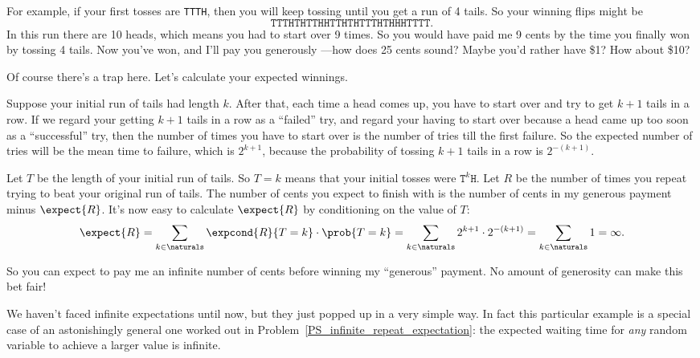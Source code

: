For example, if your first tosses are \texttt{TTTH}, then you will
keep tossing until you get a run of 4 tails.  So your winning
flips might be
\[
\texttt{TTTHTHTTHHTTHTHTTTHTHHHTTTT}.
\]
In this run there are 10 heads, which means you had to start over 9
times.  So you would have paid me 9 cents by the time you finally won
by tossing 4 tails.  Now you've won, and I'll pay you generously
---how does 25 cents sound?  Maybe you'd rather have \$1?  How about
\$10?

Of course there's a trap here.  Let's calculate your expected
winnings.

Suppose your initial run of tails had length $k$.  After that, each
time a head comes up, you have to start over and try to get $k+1$ tails
in a row.  If we regard your getting $k+1$ tails in a row as a
``failed'' try, and regard your having to start over because a head
came up too soon as a ``successful'' try, then the number of times you
have to start over is the number of tries till the first failure.  So
the expected number of tries will be the mean time to failure, which is
$2^{k+1}$, because the probability of tossing $k+1$ tails in a row is
$2^{-(k+1)}$.

Let $T$ be the length of your initial run of tails.  So $T = k$ means
that your initial tosses were $\texttt{T}^k\texttt{H}$.  Let $R$ be
the number of times you repeat trying to beat your original run of
tails.  The number of cents you expect to finish with is the number of
cents in my generous payment minus $\expect{R}$.  It's now easy to
calculate $\expect{R}$ by conditioning on the value of $T$:
\[
\expect{R}
     = \sum_{k \in \naturals} \expcond{R}{T=k} \cdot \prob{T=k}
     = \sum_{k \in \naturals}  2^{k+1} \cdot 2^{-(k+1)}
     = \sum_{k \in \naturals} 1 = \infty.
\]

\iffalse
\begin{align*}
\expect{R}
    & = \sum_{k \in \naturals} \expcond{R}{T=k} \cdot \prob{T=k}\\
    & = \sum_{k \in \naturals}  2^{k+1} \cdot 2^{-(k+1)}\\
    & = \sum_{k \in \naturals} 1 = \infty.
\end{align*}
\fi

So you can expect to pay me an infinite number of cents before winning
my ``generous'' payment.  No amount of generosity can make this bet
fair!

We haven't faced infinite expectations until now, but they just popped
up in a very simple way.  In fact this particular example is a special
case of an astonishingly general one worked out in
Problem~\ref{PS_infinite_repeat_expectation}: the expected waiting
time for \emph{any} random variable to achieve a larger value is
infinite.

